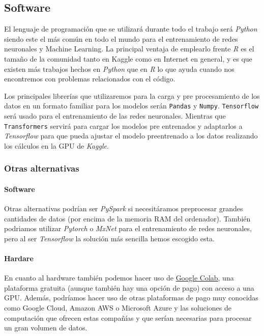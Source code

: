 \documentclass[10pt,riqno,a4paper,twoside]{article}\usepackage[]{graphicx}\usepackage[]{color}
\newcommand{\code}[1]{\texttt{#1}}
\begin{document}
\subsection{Software}

El lenguaje de programaci\'{o}n que se utilizar\'{a} durante todo el trabajo ser\'{a} \textit{Python} siendo este el m\'{a}s com\'{u}n en todo el mundo para el entrenamiento de redes neuronales y Machine Learning. La principal ventaja de emplearlo frente \textit{R} es el tamaño de la comunidad tanto en Kaggle como en Internet en general, y es que existen m\'{a}s trabajos hechos en \textit{Python} que en \textit{R} lo que ayuda cuando nos encontremos con problemas relacionados con el c\'{o}digo. 

Los principales librerías que utilizaremos para la carga y pre procesamiento de los datos en un formato familiar para los modelos serán \code{Pandas} y \code{Numpy}. \code{Tensorflow} será usado para el entrenamiento de las redes neuronales. Mientras que \code{Transformers} servirá para cargar los modelos pre entrenados y adaptarlos a \textit{Tensorflow} para que pueda ajustar el modelo preentrenado a los datos realizando los c\'{a}lculos en la GPU de \textit{Kaggle}. 




\subsubsection{Otras alternativas}

\paragraph{Software}

Otras alternativas podr\'{i}an ser \textit{PySpark} si necesit\'{a}ramos preprocesar grandes cantidades de datos (por encima de la memoria RAM del ordenador). Tambi\'{e}n podriamos utilizar \textit{Pytorch} o \textit{MxNet} para el entrenamiento de redes neuronales, pero al ser \textit{Tensorflow} la soluci\'{o}n m\'{a}s sencilla hemos escogido esta.


\paragraph{Hardare}

En cuanto al hardware tambi\'{e}n podemos hacer uso de \href{https://colab.research.google.com/?hl=es}{Google Colab}, una plataforma gratuita (aunque tambi\'{e}n hay una opci\'{o}n de pago) con acceso a una GPU. Además, podr\'{i}amos hacer uso de otras plataformas de pago muy conocidas como Google Cloud, Amazon AWS o Microsoft Azure y las soluciones de computaci\'{o}n que ofrecen estas compañ\'{i}as y que ser\'{i}an necesarias para procesar un gran volumen de datos. 
\end{document}
